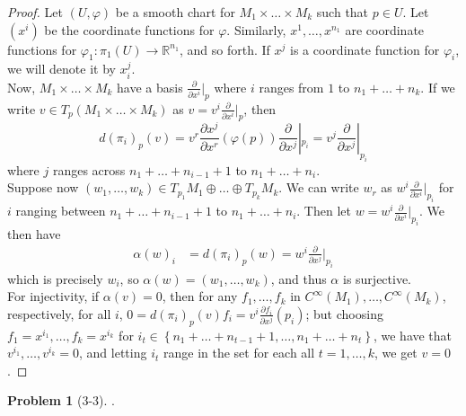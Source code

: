 \documentclass[reqno]{amsart}
\theoremstyle{plain}%
\theoremstyle{definition}
\newtheorem{problem}[theorem]{Problem}
\theoremstyle{remark}
\begin{document}
    \begin{proof}
    Let $\left( U, \varphi \right) $ be a smooth chart for
    $M_1 \times  \ldots \times M_k$ such that $p \in U$. Let
    $\left( x^{i} \right) $ be the coordinate functions for $\varphi$.
    Similarly, $x^{1},\ldots, x^{n_1}$ are coordinate
    functions for $\varphi_1  \colon \pi_1 (U) \to \mathbb{R}^{n_1}$, and so
    forth. If $x^{j}$ is a coordinate function for
    $\varphi_i$, we will denote it by $x_i^{j}$.\\
    Now, $M_1 \times \ldots \times M_k$ have a basis
    $\frac{\partial}{\partial x^{i}}|_{p}$ where
    $i$ ranges from $1$ to $n_1+ \ldots + n_k$. If we write
    $v \in T_p \left( M_1 \times \ldots \times M_k \right) $ as
    $v = v^{i} \frac{\partial}{\partial x^{i}}|_p$, then
    \[
    d \left( \pi_i \right)_p (v)
    = v^{r} \frac{\partial x^{j}}{\partial x^{r}} (\varphi (p)) \frac{\partial}{\partial x^{j}}
    |_{p_i} = v^{j} \frac{\partial}{\partial x^{j}}|_{p_i}
    \] 
    where $j$ ranges across $n_1 + \ldots+ n_{i-1}+1$ to
    $n_1 + \ldots + n_i$.\\
    Suppose now $\left( w_1, \ldots, w_k \right) \in T_{p_1}M_1 \oplus \ldots
    \oplus T_{p_k} M_k$.
    We can write
    $w_r$ as $w^{i} \frac{\partial}{\partial x^{i}}|_{p_i}$
    for $i$ ranging between $n_1 + \ldots + n_{i-1}+1$ to
    $n_1 + \ldots + n_i$. Then let
    $w = w^{i} \frac{\partial}{\partial x^{i}}|_{p_i}$.
    We then have
    \begin{align*}
        \alpha (w)_i
        &= d \left( \pi_i \right)_p (w)
        = w^{i} \frac{\partial}{\partial x^{j}}|_{p_i}
    \end{align*}
    which is precisely $w_i$, so
    $\alpha (w) = \left( w_1, \ldots, w_k \right) $, and thus
    $\alpha$ is surjective.\\
    \linebreak
    For injectivity, if $\alpha (v) = 0$, then for any $f_1, \ldots, f_k$ 
    in $C^{\infty}(M_1),\ldots, C^{\infty}(M_k)$, respectively,
    for all $i$, $0 = d \left( \pi_i \right)_p (v) f_i =
    v^{i} \frac{\partial f_i}{\partial x^{j}} (p_i)$; but choosing
    $f_{1}= x^{i_1}, \ldots, f_k = x^{i_k}$ for
    $i_t \in \left\{ n_1 + \ldots + n_{t-1}+1, \ldots,
    n_1 + \ldots + n_t\right\} $, we have that
    $v^{i_1}, \ldots, v^{i_k} = 0$, and letting
    $i_t$ range in the set for each all $t = 1 ,\ldots, k$, we get
    $v = 0$.
    \end{proof}

    \begin{problem}[3-3]
        .
    \end{problem}
\end{document}
